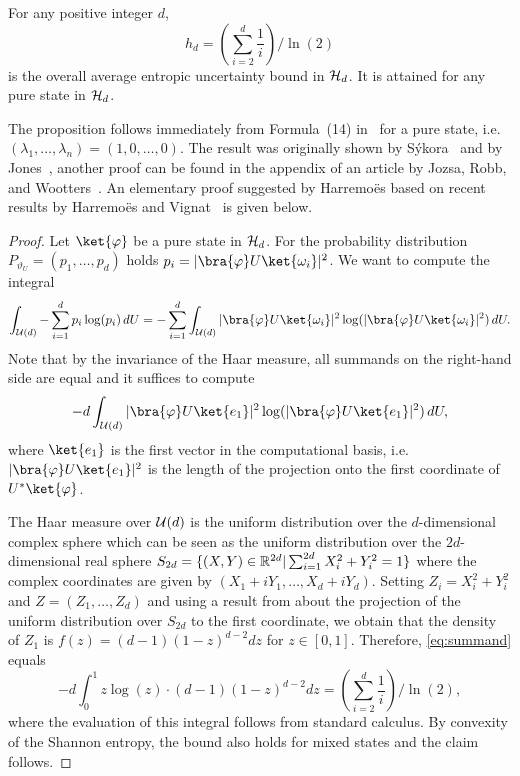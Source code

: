 \begin{proposition} \label{prop:comph} 
For any positive integer $d$, 
  \[
  h_d = \left( \sum_{i=2}^d \frac{1}{i} \right) / \ln(2)
  \]
  is the overall average entropic uncertainty bound in $\mathcal{H}_d$. It is
  attained for any pure state in $\mathcal{H}_d$.
\end{proposition}
The proposition follows immediately from Formula~(14) in~\cite{JRW94}
for a pure state, i.e. $(\lambda_1,\ldots,\lambda_n)=(1,0,\ldots,0)$.
The result was originally shown by S\'ykora~\cite{Sykora74} and by
Jones~\cite{Jones91}, another proof can be found in the appendix of
an article by Jozsa, Robb, and Wootters~\cite{JRW94}. An elementary
proof suggested by Harremo{\"es} based on recent results by
Harremo{\"e}s and Vignat~\cite{HV06} is given below.
\begin{proof}
  Let $\ket{\varphi}$ be a pure state in $\mathcal{H}_d$. For the probability
  distribution $P_{\vartheta_U}=(p_1,\ldots,p_d)$ holds $p_i =
  |\bra{\varphi}U\ket{\omega_i}|^2$. We want to compute the integral
\[ \int_{\cU(d)} -\sum_{i=1}^d p_i \log(p_i) \, d U =
-\sum_{i=1}^d \int_{\cU(d)} |\bra{\varphi}U\ket{\omega_i}|^2
\log(|\bra{\varphi}U\ket{\omega_i}|^2) \, d U.
\]
 Note that by the invariance of the Haar measure, all summands on the
 right-hand side are equal and it suffices to compute
\begin{equation} \label{eq:summand}
-d \int_{\cU(d)} |\bra{\varphi}U\ket{e_1}|^2
 \log(|\bra{\varphi}U\ket{e_1}|^2) \, d U,
\end{equation}
where $\ket{e_1}$ is the first vector in the computational basis,
i.e.~$|\bra{\varphi}U\ket{e_1}|^2$ is the length of the projection onto the first
coordinate of $U^*\ket{\varphi}$.

The Haar measure over $\mathcal{U}(d)$ is the uniform distribution over the
$d$-dimensional complex sphere which can be seen as the uniform
distribution over the $2d$-dimensional real sphere $S_{2d} =
\{(X,Y) \in \mathbb{R}^{2d} | \sum_{i=1}^{2d} X_i^2 +Y_i^2= 1\}$
where the complex coordinates are given by
$(X_1+iY_1,\ldots,X_d+iY_d)$. Setting $Z_i=X_i^2+Y_i^2$ and
$Z=(Z_1,\ldots,Z_d)$ and using a result from \cite{HV06} about the
projection of the uniform distribution over $S_{2d}$ to the first
coordinate, we obtain that the density of $Z_1$ is
$f(z)=(d-1)(1-z)^{d-2} dz$ for $z \in [0,1]$. Therefore,
\eqref{eq:summand} equals
\[ -d \int_0^1 z \log(z) \cdot (d-1)(1-z)^{d-2} dz = \left(
\sum_{i=2}^d \frac{1}{i} \right) / \ln(2),
\]
where the evaluation of this integral follows from standard
calculus. By convexity of the Shannon entropy, the bound also holds
for mixed states and the claim follows.
\end{proof}

